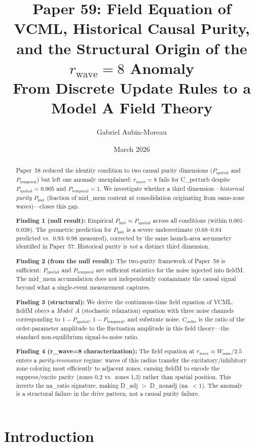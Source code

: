 \documentclass[11pt,a4paper]{article}
\title{\textbf{Paper 59: Field Equation of VCML, Historical Causal Purity,\\
and the Structural Origin of the $r_\mathrm{wave}=8$ Anomaly}\\
\large From Discrete Update Rules to a Model A Field Theory}
\author[1]{Gabriel Aubin-Moreau}
\affil[1]{Independent research}
\date{March 2026}
\newcommand{\Corder}{C_{\mathrm{order}}}
\newcommand{\Psp}{P_{\mathrm{spatial}}}
\newcommand{\Ptemp}{P_{\mathrm{temporal}}}
\newcommand{\Phist}{P_{\mathrm{hist}}}
\begin{document}
\maketitle

\begin{abstract}
Paper~58 reduced the identity condition to two causal purity dimensions
($\Psp$ and $\Ptemp$) but left one anomaly unexplained:
$r_\mathrm{wave}=8$ fails for C\_perturb despite $\Psp=0.905$
and $\Ptemp=1$.
We investigate whether a third dimension---\emph{historical purity}
$\Phist$ (fraction of mid\_mem content at consolidation originating
from same-zone waves)---closes this gap.

\textbf{Finding 1 (null result):}
Empirical $\Phist \approx \Psp$ across all conditions (within 0.001--0.038).
The geometric prediction for $\Phist$ is a severe underestimate (0.68--0.84 predicted
vs.\ 0.93--0.98 measured), corrected by the same launch-area asymmetry identified in
Paper~57.
Historical purity is \emph{not} a distinct third dimension.

\textbf{Finding 2 (from the null result):}
The two-purity framework of Paper~58 is sufficient: $\Psp$ and $\Ptemp$ are
sufficient statistics for the noise injected into fieldM. The mid\_mem accumulation
does not independently contaminate the causal signal beyond what a single-event
measurement captures.

\textbf{Finding 3 (structural):}
We derive the continuous-time field equation of VCML.
fieldM obeys a \emph{Model~A} (stochastic relaxation) equation with three noise
channels corresponding to $1-\Psp$, $1-\Ptemp$, and substrate noise.
$\Corder$ is the ratio of the order-parameter amplitude to the fluctuation
amplitude in this field theory---the standard non-equilibrium signal-to-noise ratio.

\textbf{Finding 4 (r\_{wave}=8 characterization):}
The field equation at $r_\mathrm{wave}\approx W_\mathrm{zone}/2.5$
enters a \emph{parity-resonance} regime: waves of this radius transfer the
excitatory/inhibitory zone coloring most efficiently to adjacent zones,
causing fieldM to encode the suppress/excite parity (zones 0,2 vs.\ zones 1,3)
rather than spatial position.
This inverts the na\_ratio signature, making D\_adj $>$ D\_nonadj (na~$<1$).
The anomaly is a structural failure in the drive pattern, not a causal purity failure.
\end{abstract}

\section{Introduction}
\end{document}
